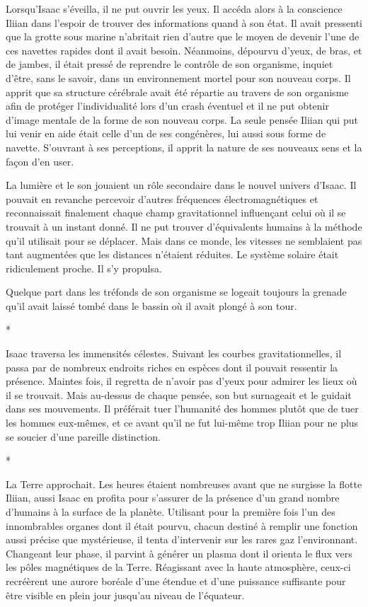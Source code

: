 \documentclass[12pt]{book}
\newcommand{\s}{\begin{center}
*
\end{center}
}
\begin{document}
Lorsqu'Isaac s'éveilla, il ne put ouvrir les yeux. Il accéda alors à la conscience Iliian dans l'espoir de trouver des informations quand à son état. Il avait pressenti que la grotte sous marine n'abritait rien d'autre que le moyen de devenir l'une de ces navettes rapides dont il avait besoin. Néanmoins, dépourvu d'yeux, de bras, et de jambes, il était pressé de reprendre le contrôle de son organisme, inquiet d'être, sans le savoir, dans un environnement mortel pour son nouveau corps. Il apprit que sa structure cérébrale avait été répartie au travers de son organisme afin de protéger l'individualité lors d'un crash éventuel et il ne put obtenir d'image mentale de la forme de son nouveau corps. La seule pensée Iliian qui put lui venir en aide était celle d'un de ses congénères, lui aussi sous forme de navette. S'ouvrant à ses perceptions, il apprit la nature de ses nouveaux sens et la façon d'en user.


La lumière et le son jouaient un rôle secondaire dans le nouvel univers d'Isaac. Il pouvait en revanche percevoir d'autres fréquences électromagnétiques et reconnaissait finalement chaque champ gravitationnel influençant celui où il se trouvait à un instant donné. Il ne put trouver d'équivalents humains à la méthode qu'il utilisait pour se déplacer. Mais dans ce monde, les vitesses ne semblaient pas tant augmentées que les distances n'étaient réduites. Le système solaire était ridiculement proche. Il s'y propulsa.


Quelque part dans les tréfonds de son organisme se logeait toujours la grenade qu'il avait laissé tombé dans le bassin où il avait plongé à son tour.

\s


Isaac traversa les immensités célestes. Suivant les courbes gravitationnelles, il passa par de nombreux endroits riches en espèces dont il pouvait ressentir la présence. Maintes fois, il regretta de n'avoir pas d'yeux pour admirer les lieux où il se trouvait. Mais au-dessus de chaque pensée, son but surnageait et le guidait dans ses mouvements. Il préférait tuer l'humanité des hommes plutôt que de tuer les hommes eux-mêmes, et ce avant qu'il ne fut lui-même trop Iliian pour ne plus se soucier d'une pareille distinction.

\s

La Terre approchait. Les heures étaient nombreuses avant que ne surgisse la flotte Iliian, aussi Isaac en profita pour s'assurer de la présence d'un grand nombre d'humains à la surface de la planète. Utilisant pour la première fois l'un des innombrables organes dont il était pourvu, chacun destiné à remplir une fonction aussi précise que mystérieuse, il tenta d'intervenir sur les rares gaz l'environnant. Changeant leur phase, il parvint à générer un plasma dont il orienta le flux vers les pôles magnétiques de la Terre. Réagissant avec la haute atmosphère, ceux-ci recréèrent une aurore boréale d'une étendue et d'une puissance suffisante pour être visible en plein jour jusqu'au niveau de l'équateur.
\end{document}
